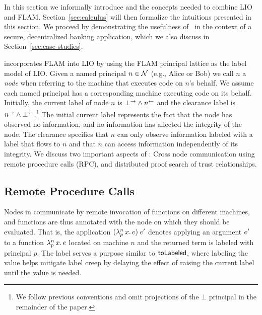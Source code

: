 In this section we informally introduce \lang{} and the concepts needed to combine LIO and FLAM. Section~\ref{sec:calculus} will then formalize the intuitions presented in this section. We proceed by demonstrating the usefulness of \lang{}\ in the context of a secure, decentralized banking application, which we also discuss in Section~\ref{sec:case-studies}.

\lang{} incorporates FLAM into LIO by using the FLAM principal lattice as the label model of LIO.
Given a named principal $n \in \mathcal{N}$ (e.g., Alice or Bob) we call $n$ a \emph{node} when referring to the machine that executes code on $n$'s behalf. We assume each named principal has a corresponding machine executing code on its behalf. Initially, the current label of node $n$ is $\bot^{\rightarrow} \wedge n^{\leftarrow}$ and the clearance label is $n^{\rightarrow} \wedge \bot^{\leftarrow}$.\footnote{We follow previous conventions \cite{Arden:2015:FA:2859845.2859998} and omit projections of the $\bot$ principal in the remainder of the paper.} The initial current label represents the fact that the node has observed no information, and no information has affected the integrity of the node. The clearance specifies that $n$ can only observe information labeled with a label that flows to $n$ and that $n$ can access information independently of its integrity. We discuss two important aspects of \lang: Cross node communication using remote procedure calls (RPC), and distributed proof search of trust relationships.

\subsection{Remote Procedure Calls}
Nodes in \lang{} communicate by remote invocation of functions on different machines, and functions are thus annotated with the node on which they should be evaluated. That is, the application $(\lambda^{n}_{p}\,x.\,e)\;e'$ denotes applying an argument $e'$ to a function $\lambda^{n}_{p}\,x.\,e$ located on machine $n$ and the returned term is labeled with principal $p$. The label serves a purpose similar to $\mathsf{toLabeled}$, where labeling the value helps mitigate label creep by delaying the effect of raising the current label until the value is needed.

